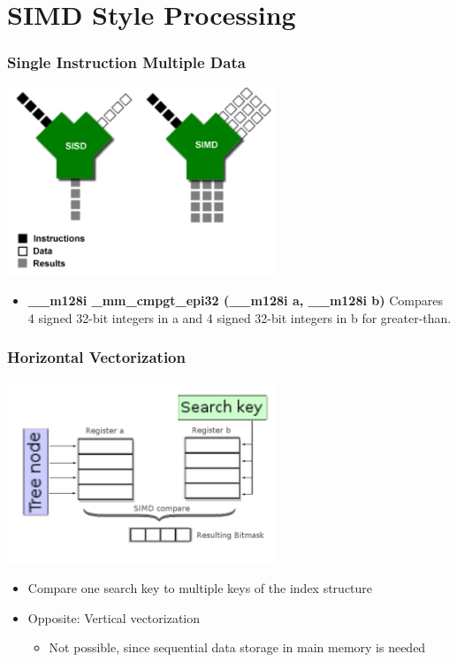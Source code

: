 \documentclass{beamer}
\begin{document}
\section{SIMD Style Processing}
\begin{frame}
\frametitle{Single Instruction Multiple Data}
\begin{center}
	\includegraphics[width=0.6\textwidth]{img/simd.png}
\end{center}
\begin{itemize}
	\item \textbf{\_\_m128i \_mm\_cmpgt\_epi32 (\_\_m128i a, \_\_m128i b)} Compares 4 signed 32-bit integers in a and 4 signed 32-bit integers
	in b for greater-than.
\end{itemize}
\end{frame}
\begin{frame}
\frametitle{Horizontal Vectorization}
\begin{center}
	\includegraphics[width=0.6\textwidth]{img/horizontal_vectorization.png}
\end{center}
\begin{itemize}
	\item Compare one search key to multiple keys of the index structure
	\item Opposite: Vertical vectorization
	\begin{itemize}
		\item Not possible, since sequential data storage in main memory is needed
	\end{itemize}
\end{itemize}
\end{frame}
\end{document}
